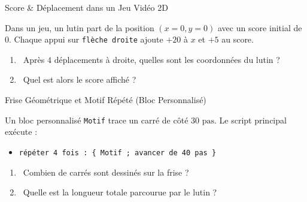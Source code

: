\begin{exercice}[3 pts][\capValider]{Score \& Déplacement dans un Jeu Vidéo 2D}
\noindent
\begin{minipage}[c]{0.58\linewidth}
Dans un jeu, un lutin part de la position $(x=0, y=0)$ avec un score initial de $0$.
Chaque appui sur \texttt{flèche droite} ajoute $+20$ à $x$ et $+5$ au score.
\begin{enumerate}[leftmargin=1.2em, itemsep=1pt]
    \item \capRealiser\ Après $4$ déplacements à droite, quelles sont les coordonnées du lutin ?
    \item \capValider\ Quel est alors le score affiché ?
\end{enumerate}
\end{minipage}\hfill
\begin{minipage}[c]{0.38\linewidth}
\centering
{}
\end{minipage}

\vspace{1mm}
\lignesreponse[2]
\end{exercice}

\begin{exercice}[3 pts][\capRealiser]{Frise Géométrique et Motif Répété (Bloc Personnalisé)}
\noindent
\begin{minipage}[c]{0.58\linewidth}
Un bloc personnalisé \texttt{Motif} trace un carré de côté $30\text{ pas}$.
Le script principal exécute :
\begin{itemize}[leftmargin=1.2em, itemsep=1pt]
    \item \texttt{répéter 4 fois : \{ Motif ; avancer de 40 pas \}}
\end{itemize}
\begin{enumerate}[leftmargin=1.2em, itemsep=1pt]
    \item \capRealiser\ Combien de carrés sont dessinés sur la frise ?
    \item \capValider\ Quelle est la longueur totale parcourue par le lutin ?
\end{enumerate}
\end{minipage}\hfill
\begin{minipage}[c]{0.38\linewidth}
\centering
{}
\end{minipage}

\vspace{1mm}
\lignesreponse[2]
\end{exercice}

